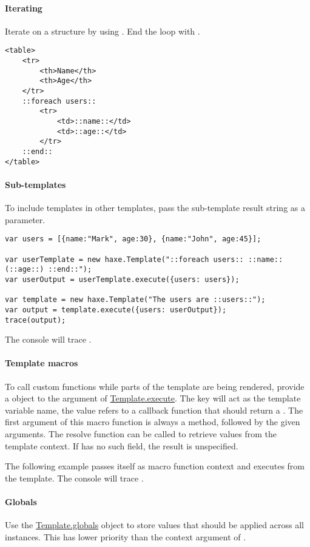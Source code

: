 \paragraph{Iterating}
Iterate on a structure by using . End the loop with .
\begin{lstlisting}
<table>
	<tr>
		<th>Name</th>
		<th>Age</th>
	</tr>
	::foreach users::
		<tr>
			<td>::name::</td>
			<td>::age::</td>
		</tr>
	::end::
</table>
\end{lstlisting} 

\paragraph{Sub-templates}
To include templates in other templates, pass the sub-template result string as a parameter.
\begin{lstlisting} 
var users = [{name:"Mark", age:30}, {name:"John", age:45}];

var userTemplate = new haxe.Template("::foreach users:: ::name::(::age::) ::end::");
var userOutput = userTemplate.execute({users: users});

var template = new haxe.Template("The users are ::users::");
var output = template.execute({users: userOutput});
trace(output);
\end{lstlisting} 
The console will trace .

\paragraph{Template macros}
To call custom functions while parts of the template are being rendered, provide a  object to the argument of \href{https://api.haxe.org/haxe/Template.html#execute}{Template.execute}. The key will act as the template variable name, the value refers to a callback function that should return a . The first argument of this macro function is always a  method, followed by the given arguments. The resolve function can be called to retrieve values from the template context. If  has no such field, the result is unspecified.

The following example passes itself as macro function context and executes  from the template.
The console will trace .

\paragraph{Globals}
Use the \href{https://api.haxe.org/haxe/Template.html#globals}{Template.globals} object to store values that should be applied across all  instances. This has lower priority than the context argument of .

